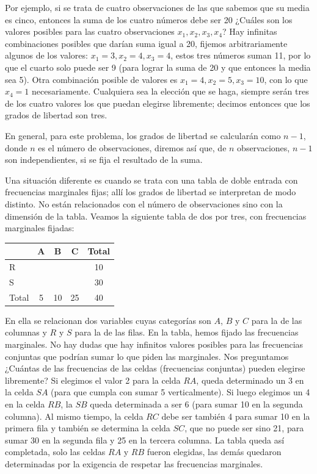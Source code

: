 \documentclass[]{book}
\begin{document}
Por ejemplo, si se trata de cuatro observaciones de las que sabemos que
su media es cinco, entonces la suma de los cuatro números debe ser 20
¿Cuáles son los valores posibles para las cuatro observaciones \(x_{1}, x_{2}, x_{3}, x_{4}\)? Hay infinitas combinaciones posibles que darían suma igual a 20, fijemos arbitrariamente algunos de los valores: \(x_{1}=3, x_{2}=4, x_{3}=4\), estos tres números suman 11, por lo que el cuarto solo puede ser 9 (para lograr la suma de 20 y que entonces la media sea 5). Otra combinación posible de valores es \(x_{1}=4, x_{2}=5, x_{3}=10\), con lo que \(x_{4}=1\) necesariamente. Cualquiera sea la elección que se haga, siempre serán tres de los cuatro valores los que puedan elegirse libremente; decimos entonces que los grados de libertad son tres.

En general, para este problema, los grados de libertad se calcularán
como \(n-1\), donde \(n\) es el número de observaciones, diremos así que, de \(n\) observaciones, \(n-1\) son independientes, si se fija el resultado de la suma.

Una situación diferente es cuando se trata con una tabla de doble
entrada con frecuencias marginales fijas; allí los grados de libertad se
interpretan de modo distinto. No están relacionados con el número de
observaciones sino con la dimensión de la tabla. Veamos la siguiente
tabla de dos por tres, con frecuencias marginales fijadas:

\begin{table}[H]
\centering
\begin{tabular}{lcccc}
\toprule
 & A & B & C & Total\\
\midrule
\rowcolor{gray!6}  R &  &  &  & 10\\
S &  &  &  & 30\\
\rowcolor{gray!6}  Total & 5 & 10 & 25 & 40\\
\bottomrule
\end{tabular}
\end{table}

En ella se relacionan dos variables cuyas categorías son \(A\), \(B\) y \(C\) para
la de las columnas y \(R\) y \(S\) para la de las filas. En la tabla, hemos
fijado las frecuencias marginales. No hay dudas que hay infinitos
valores posibles para las frecuencias conjuntas que podrían sumar lo que
piden las marginales. Nos preguntamos ¿Cuántas de las frecuencias de las
celdas (frecuencias conjuntas) pueden elegirse libremente? Si elegimos
el valor 2 para la celda \(RA\), queda determinado un 3 en la celda \(SA\) (para
que cumpla con sumar 5 verticalmente). Si luego elegimos un 4 en la
celda \(RB\), la \(SB\) queda determinada a ser 6 (para sumar 10 en la segunda
columna). Al mismo tiempo, la celda \(RC\) debe ser también 4 para sumar 10
en la primera fila y también se determina la celda \(SC\), que no puede ser
sino 21, para sumar 30 en la segunda fila y 25 en la tercera columna. La
tabla queda así completada, solo las celdas \(RA\) y \(RB\) fueron elegidas, las
demás quedaron determinadas por la exigencia de respetar las frecuencias
marginales.
\end{document}
